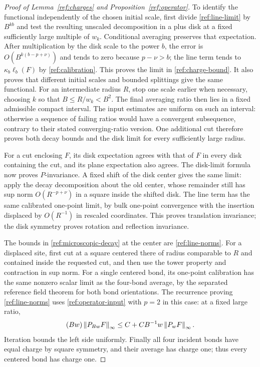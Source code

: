 \begin{proof}[Proof of Lemma~\ref{ref:charges} and
Proposition~\ref{ref:operator}]
To identify the functional independently of the chosen initial scale,
first divide \eqref{ref:line-limit} by $B^{kb}$ and test the resulting
unscaled decomposition in a plus disk at a fixed sufficiently large
multiple of $w_k$.  Conditional averaging preserves that expectation.
After multiplication by the disk scale to the power $b$, the error is
$O(B^{k(b-p+\nu)})$ and tends to zero because $p-\nu>b$; the line term tends to
$\kappa_b \ell_b(F)$ by \eqref{ref:calibration}.  This proves the limit in
\eqref{ref:charge-bound}.  It also proves that different initial scales and
bounded splittings give the same functional.  For an intermediate radius $R$, stop one scale earlier when necessary,
choosing $k$ so that $B\le R/w_k<B^2$.  The final averaging ratio then
lies in a fixed admissible compact interval.
The input estimates are uniform on such an interval: otherwise a sequence
of failing ratios would have a convergent subsequence, contrary to their
stated converging-ratio version.  One additional cut therefore proves both
decay bounds and the disk limit for every sufficiently large radius.

For a cut enclosing $F$, its disk expectation agrees with that of $F$ in
every disk containing the cut, and its plane expectation also agrees.
The disk-limit formula now proves $P$-invariance.  A fixed shift of the disk
center gives the same limit: apply the decay decomposition about the old
center, whose remainder still has sup norm $O(R^{-p+\nu})$ in a square
inside the shifted disk.  The line term has the same calibrated one-point
limit, by bulk one-point convergence with the insertion displaced by
$O(R^{-1})$ in rescaled coordinates.  This proves translation invariance;
the disk symmetry proves rotation and reflection invariance.

The bounds in \eqref{ref:microscopic-decay} at the center are
\eqref{ref:line-norms}.  For a displaced site, first cut at a square centered
there of radius comparable to $R$ and contained inside the requested cut,
and then use the tower property and contraction in sup norm.  For a single
centered bond, its one-point calibration has the same nonzero scalar limit
as the four-bond average, by the separated reference field theorem for both
bond orientations.  The recurrence proving \eqref{ref:line-norms} uses
\eqref{ref:operator-input} with $p=2$ in this case: at a fixed large ratio,
\[
 (Bw)\left\lVert P_{Bw}F\right\rVert_\infty
       \le C+CB^{-1}w\left\lVert P_wF\right\rVert_\infty.
\]
Iteration bounds the left side uniformly.  Finally all four incident bonds
have equal charge by square symmetry, and their average has charge one;
thus every centered bond has charge one.
\end{proof}

